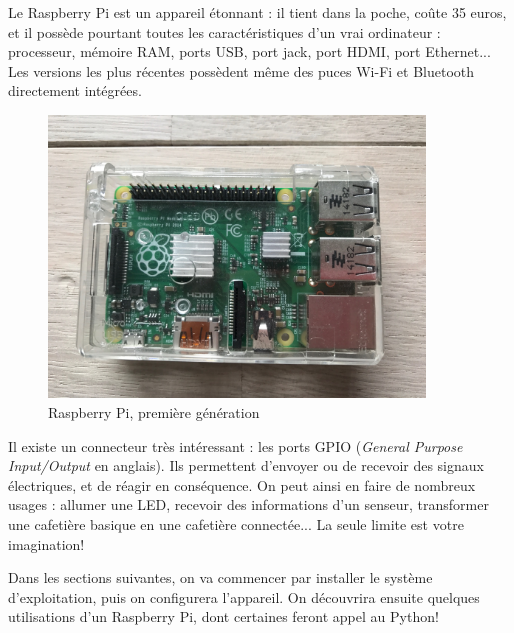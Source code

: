 Le Raspberry Pi est un appareil étonnant : il tient dans la poche, coûte 35 euros, et il possède pourtant toutes les caractéristiques d'un vrai ordinateur : processeur, mémoire RAM, ports USB, port jack, port HDMI, port Ethernet... Les versions les plus récentes possèdent même des puces Wi-Fi et Bluetooth directement intégrées.

\begin{figure}[h!]
\begin{center}
\includegraphics[width=10cm]{raspberry.JPG}
\end{center}
\caption{Raspberry Pi, première génération}
\label{raspberry}
\end{figure}

Il existe un connecteur très intéressant : les ports GPIO (\textit{General Purpose Input/Output} en anglais). Ils permettent d'envoyer ou de recevoir des signaux électriques, et de réagir en conséquence. On peut ainsi en faire de nombreux usages : allumer une LED, recevoir des informations d'un senseur, transformer une cafetière basique en une cafetière connectée... La seule limite est votre imagination!

Dans les sections suivantes, on va commencer par installer le système d'exploitation, puis on configurera l'appareil. On découvrira ensuite quelques utilisations d'un Raspberry Pi, dont certaines feront appel au Python!